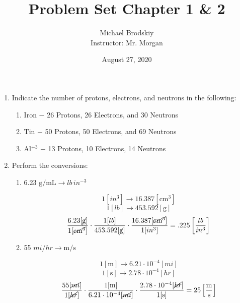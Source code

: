\documentclass[12pt]{article}
\title{Problem Set Chapter 1 \& 2}
\date{August 27, 2020}
\author{Michael Brodskiy\\ \small Instructor: Mr. Morgan}
\begin{document}
\maketitle

\begin{enumerate}

  \item Indicate the number of protons, electrons, and neutrons in the following:

    \begin{enumerate}

      \item Iron $-$ 26 Protons, 26 Electrons, and 30 Neutrons

      \item Tin $-$ 50 Protons, 50 Electrons, and 69 Neutrons

      \item Al$^{+3}$ $-$  13 Protons, 10 Electrons, 14 Neutrons

    \end{enumerate}

  \item Perform the conversions:

    \begin{enumerate}

      \item 6.23 $\si{\gram\per\milli\liter} \rightarrow lb\,in^{-3}$

                            $$1[in^3]\rightarrow16.387[\si{\centi\meter\cubed}]$$
                            $$1[lb]\rightarrow453.592[\si{\gram}]$$
                            $$\frac{6.23[\cancel{\si{\gram}}]}{1[\cancel{\si{\centi\meter\cubed}}]}\cdot\frac{1[lb]}{453.592[\cancel{\si{\gram}}]}\cdot\frac{16.387[\cancel{\si{\centi\meter\cubed}}]}{1[in^3]}=.225\left[\frac{lb}{in^3}\right]$$


                          \item 55 $mi/hr \rightarrow \si{\meter}/\si{\second}$

                            $$1[\si{\meter}]\rightarrow6.21\cdot10^{-4}[mi]$$
                            $$1[\si{\second}]\rightarrow2.78\cdot10^{-4}[hr]$$
                            $$\frac{55[\cancel{mi}]}{1[\cancel{hr}]}\cdot\frac{1[\si{\meter}]}{6.21\cdot10^{-4}[\cancel{mi}]}\cdot\frac{2.78\cdot10^{-4}[\cancel{hr}]}{1[\si{\second}]}=25\left[\frac{\si{\meter}}{\si{\second}}\right]$$

    \end{enumerate}


\end{enumerate}
\end{document}
